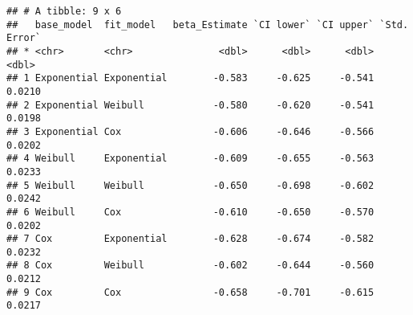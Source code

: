 \documentclass[]{article}
\begin{document}
\begin{verbatim}
## # A tibble: 9 x 6
##   base_model  fit_model   beta_Estimate `CI lower` `CI upper` `Std. Error`
## * <chr>       <chr>               <dbl>      <dbl>      <dbl>        <dbl>
## 1 Exponential Exponential        -0.583     -0.625     -0.541       0.0210
## 2 Exponential Weibull            -0.580     -0.620     -0.541       0.0198
## 3 Exponential Cox                -0.606     -0.646     -0.566       0.0202
## 4 Weibull     Exponential        -0.609     -0.655     -0.563       0.0233
## 5 Weibull     Weibull            -0.650     -0.698     -0.602       0.0242
## 6 Weibull     Cox                -0.610     -0.650     -0.570       0.0202
## 7 Cox         Exponential        -0.628     -0.674     -0.582       0.0232
## 8 Cox         Weibull            -0.602     -0.644     -0.560       0.0212
## 9 Cox         Cox                -0.658     -0.701     -0.615       0.0217
\end{verbatim}
\end{document}
